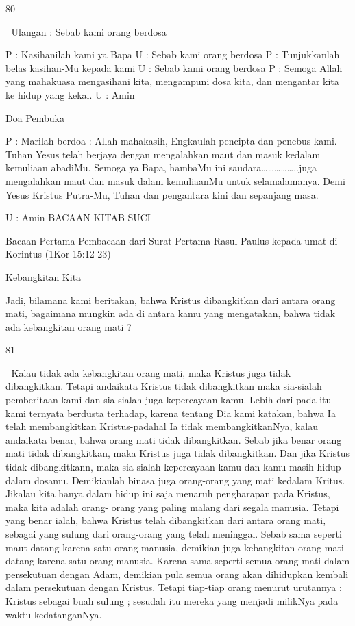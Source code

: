 \documentclass[10pt,a5paper,fancyhdr]{memoir}
\begin{document}
80 



Ulangan : Sebab kami orang berdosa 


P : Kasihanilah kami ya Bapa 
U : Sebab kami orang berdosa 
P : Tunjukkanlah belas kasihan-Mu kepada kami 
U : Sebab kami orang berdosa 
P : Semoga Allah yang mahakuasa mengasihani kita, 
mengampuni dosa kita, dan mengantar kita ke hidup yang 
kekal. 
U : Amin 

Doa Pembuka 

P : Marilah berdoa : 
Allah 
mahakasih, Engkaulah pencipta dan penebus kami. 
Tuhan Yesus telah berjaya dengan mengalahkan maut dan 
masuk kedalam kemuliaan abadiMu. Semoga ya Bapa, 
hambaMu ini saudara……………..juga mengalahkan 
maut dan masuk dalam kemuliaanMu untuk selamalamanya. 
Demi Yesus Kristus Putra-Mu, Tuhan dan 
pengantara kini dan sepanjang masa. 

U : Amin 
BACAAN KITAB SUCI 

Bacaan Pertama 
Pembacaan dari Surat Pertama Rasul Paulus kepada umat di 
Korintus (1Kor 15:12-23) 

Kebangkitan Kita 

Jadi, bilamana kami beritakan, bahwa Kristus dibangkitkan 
dari antara orang mati, bagaimana mungkin ada di antara kamu 
yang mengatakan, bahwa tidak ada kebangkitan orang mati ? 

81 



Kalau tidak ada kebangkitan orang mati, maka Kristus juga 
tidak dibangkitkan. Tetapi andaikata Kristus tidak dibangkitkan 
maka sia-sialah pemberitaan kami dan sia-sialah juga 
kepercayaan kamu. Lebih dari pada itu kami ternyata berdusta 
terhadap, karena tentang Dia kami katakan, bahwa Ia telah 
membangkitkan Kristus-padahal Ia tidak membangkitkanNya, 
kalau andaikata benar, bahwa orang mati tidak dibangkitkan. 
Sebab jika benar orang mati tidak dibangkitkan, maka Kristus 
juga tidak dibangkitkan. Dan jika Kristus tidak dibangkitkann, 
maka sia-sialah kepercayaan kamu dan kamu masih hidup 
dalam dosamu. Demikianlah binasa juga orang-orang yang mati 
kedalam Kritus. Jikalau kita hanya dalam hidup ini saja 
menaruh pengharapan pada Kristus, maka kita adalah orang-
orang yang paling malang dari segala manusia. Tetapi yang 
benar ialah, bahwa Kristus telah dibangkitkan dari antara orang 
mati, sebagai yang sulung dari orang-orang yang telah 
meninggal. Sebab sama seperti maut datang karena satu orang 
manusia, demikian juga kebangkitan orang mati datang karena 
satu orang manusia. Karena sama seperti semua orang mati 
dalam persekutuan dengan Adam, demikian pula semua orang 
akan dihidupkan kembali dalam persekutuan dengan Kristus. 
Tetapi tiap-tiap orang menurut urutannya : Kristus sebagai buah 
sulung ; sesudah itu mereka yang menjadi milikNya pada waktu 
kedatanganNya. 
\end{document}
